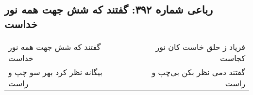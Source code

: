 \begin{center}
\section*{رباعی شماره ۳۹۲: گفتند که شش جهت همه نور خداست}
\label{sec:0392}
\begin{longtable}{l p{0.5cm} r}
گفتند که شش جهت همه نور خداست
&&
فریاد ز حلق خاست کان نور کجاست
\\
بیگانه نظر کرد بهر سو چپ و راست
&&
گفتند دمی نظر بکن بی‌چپ و راست
\\
\end{longtable}
\end{center}
